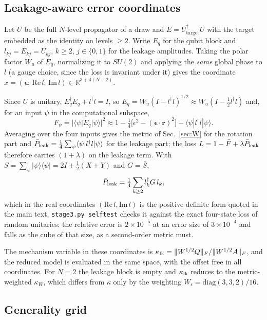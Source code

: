 \documentclass[aps,pra,onecolumn,notitlepage,superscriptaddress,nofootinbib,floatfix]{revtex4-2}
\begin{document}
\subsection{Leakage-aware error coordinates}
\label{sec:leakmetric}

Let $U$ be the full $N$-level propagator of a draw and
$E=U_{\mathrm{target}}^\dagger U$ with the target embedded as the identity on
levels $\ge2$. Write $E_q$ for the qubit block and $l_{kj}=E_{kj}=U_{kj}$,
$k\ge2$, $j\in\{0,1\}$ for the leakage amplitudes. Taking the polar factor
$W_u$ of $E_q$, normalizing it to $SU(2)$ and applying the \emph{same} global
phase to $l$ (a gauge choice, since the loss is invariant under it) gives the
coordinate
$x=(\bm\epsilon;\,\mathrm{Re}\,l;\,\mathrm{Im}\,l)\in\mathbb R^{3+4(N-2)}$.

Since $U$ is unitary, $E_q^\dagger E_q+l^\dagger l=I$, so
$E_q=W_u(I-l^\dagger l)^{1/2}\approx W_u(I-\tfrac12l^\dagger l)$ and, for an
input $\psi$ in the computational subspace,
\[
F_\psi=|\langle\psi|E_q|\psi\rangle|^2
\approx1-\tfrac14\big[\epsilon^2-(\bm\epsilon\cdot\mathbf r)^2\big]-\langle\psi|l^\dagger l|\psi\rangle .
\]
Averaging over the four inputs gives the metric of Sec.~\ref{sec:W} for the
rotation part and $\bar P_{\rm leak}=\tfrac14\sum_\psi\langle\psi|l^\dagger l|\psi\rangle$
for the leakage part; the loss $L=1-\bar F+\lambda\bar P_{\rm leak}$ therefore
carries $(1+\lambda)$ on the leakage term. With
$S=\sum_\psi|\psi\rangle\langle\psi|=2I+\tfrac12(X+Y)$ and $G=\bar S$,
\[
\bar P_{\rm leak}=\tfrac14\sum_{k\ge2}l_k^\dagger G\,l_k ,
\]
which in the real coordinates $(\mathrm{Re}\,l,\mathrm{Im}\,l)$ is the
positive-definite form quoted in the main text. \texttt{stage3.py selftest}
checks it against the exact four-state loss of random unitaries: the relative
error is $2\times10^{-5}$ at an error size of $3\times10^{-4}$ and falls as the
cube of that size, as a second-order metric must.

The mechanism variable in these coordinates is
$\kappa_{\rm lk}=\|W^{1/2}Q\|_F/\|W^{1/2}A\|_F$, and the reduced model is
evaluated in the same space, with the offset free in all coordinates. For
$N=2$ the leakage block is empty and $\kappa_{\rm lk}$ reduces to the
metric-weighted $\kappa_W$, which differs from $\kappa$ only by the weighting
$W_\epsilon=\mathrm{diag}(3,3,2)/16$.

\subsection{Generality grid}
\label{sec:stage3generality}
\end{document}

